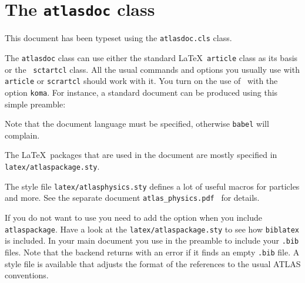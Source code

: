 \section{The \texttt{atlasdoc} class}
\label{app:atlasdoc}

This document has been typeset using the \texttt{atlasdoc.cls} class.

The \texttt{atlasdoc} class can use either the standard \LaTeX\ \texttt{article} class
as its basis or the \KOMAScript\ \texttt{sctartcl} class.
All the usual commands and options you usually use
with \texttt{article}  or \texttt{scrartcl} should work with it. 
You turn on the use of \KOMAScript\ with the option \texttt{koma}.
For instance, a standard document can be produced using this simple preamble:
%
%
Note that the document language must be specified, otherwise \texttt{babel} will complain.

The \LaTeX\ packages that are used in the document are mostly specified in 
\texttt{latex/atlaspackage.sty}.

The style file \texttt{latex/atlasphysics.sty} defines a lot of useful
macros for particles and more. See the separate document
\texttt{atlas\_physics.pdf}~\cite{atlas-physics} for details.

If you do not want to use  you need to add the option  when you
include \texttt{atlaspackage}.
Have a look at the \texttt{latex/atlaspackage.sty} to see how \texttt{biblatex} is included.
In your main document you use  in the preamble to include your \texttt{.bib} files.
Note that the backend  returns with an error if it finds an empty \texttt{.bib} file.
A style file  is available that adjusts the format of the references to the usual ATLAS conventions.

